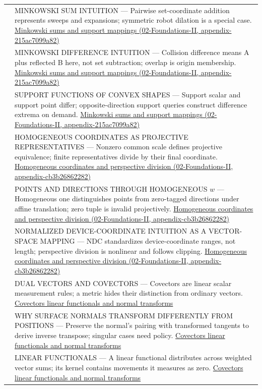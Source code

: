 {\begin{longtable}[]{@{}
  >{\raggedright\arraybackslash}p{}
  >{\raggedright\arraybackslash}p{}@{}}
575 & MINKOWSKI SUM INTUITION --- Pairwise set-coordinate addition represents sweeps and expansions; symmetric robot dilation is a special case. \href{}{Minkowski sums and support mappings (02-Foundations-II, appendix-215ac7099a82)} \\
576 & MINKOWSKI DIFFERENCE INTUITION --- Collision difference means A plus reflected B here, not set subtraction; overlap is origin membership. \href{}{Minkowski sums and support mappings (02-Foundations-II, appendix-215ac7099a82)} \\
577 & SUPPORT FUNCTIONS OF CONVEX SHAPES --- Support scalar and support point differ; opposite-direction support queries construct difference extrema on demand. \href{}{Minkowski sums and support mappings (02-Foundations-II, appendix-215ac7099a82)} \\
578 & HOMOGENEOUS COORDINATES AS PROJECTIVE REPRESENTATIVES --- Nonzero common scale defines projective equivalence; finite representatives divide by their final coordinate. \href{}{Homogeneous coordinates and perspective division (02-Foundations-II, appendix-cb3b26862282)} \\
579 & POINTS AND DIRECTIONS THROUGH HOMOGENEOUS \(w\) --- Homogeneous one distinguishes points from zero-tagged directions under affine translation; zero tuple is invalid projectively. \href{}{Homogeneous coordinates and perspective division (02-Foundations-II, appendix-cb3b26862282)} \\
580 & NORMALIZED DEVICE-COORDINATE INTUITION AS A VECTOR-SPACE MAPPING --- NDC standardizes device-coordinate ranges, not length; perspective division is nonlinear and follows clipping. \href{}{Homogeneous coordinates and perspective division (02-Foundations-II, appendix-cb3b26862282)} \\
581 & DUAL VECTORS AND COVECTORS --- Covectors are linear scalar measurement rules; a metric hides their distinction from ordinary vectors. \hyperref[appendix-46da295c6787]{Covectors linear functionals and normal transforms} \\
582 & WHY SURFACE NORMALS TRANSFORM DIFFERENTLY FROM POSITIONS --- Preserve the normal's pairing with transformed tangents to derive inverse transpose; singular cases need policy. \hyperref[appendix-46da295c6787]{Covectors linear functionals and normal transforms} \\
583 & LINEAR FUNCTIONALS --- A linear functional distributes across weighted vector sums; its kernel contains movements it measures as zero. \hyperref[appendix-46da295c6787]{Covectors linear functionals and normal transforms} \\

\end{longtable}}
